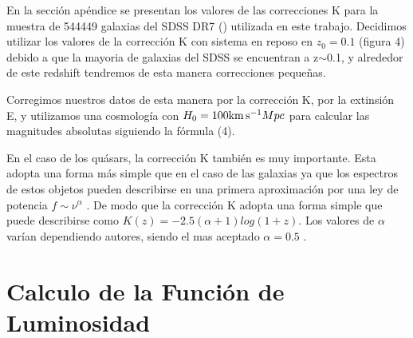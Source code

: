 \documentclass[a4paper,10pt]{article}
\newcommand{\kms}{{\rm km\,s^{-1}}}
\begin{document}
En la secci\'on ap\'endice se presentan los valores de las correcciones K para la muestra de 544449 galaxias del SDSS DR7 (\citealt{SDSS,Abazajian2009}) utilizada en este trabajo. Decidimos utilizar los valores de la correcci\'on K con sistema en reposo en $z_{0}=0.1$ (figura 4) debido a que la mayoria de galaxias del SDSS se encuentran a z$\sim$0.1, y alrededor de este redshift tendremos de esta manera correcciones pequeñas. 



Corregimos nuestros datos de esta manera por la correcci\'on K, por la extinsi\'on E, y utilizamos una cosmolog\'ia con $H_{0}=100\kms Mpc$ para calcular las magnitudes absolutas siguiendo la f\'ormula (4).

En el caso de los qu\'asars, la correcci\'on K tambi\'en es muy importante. Esta adopta una forma m\'as simple que en el caso de las galaxias ya que los espectros de estos objetos pueden describirse en una primera aproximaci\'on por una ley de potencia $f\sim\nu^{\alpha}$  \citep{Richstone1980}. De modo que la correcci\'on K adopta una forma simple que puede describirse como $K(z)=-2.5(\alpha+1)log(1+z)$. Los valores de $\alpha$ var\'ian dependiendo autores, siendo el mas aceptado $\alpha=0.5$ \citep{Wisotzki2000}.






\section{Calculo de la Funci\'on de Luminosidad}
\end{document}

